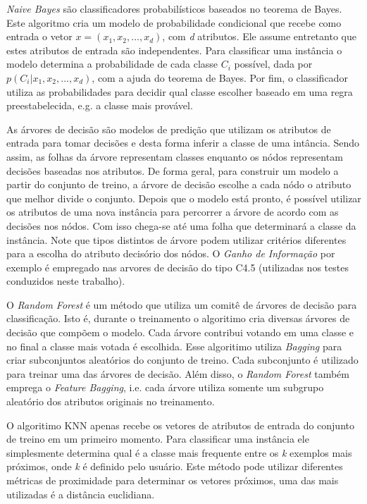 \textit{Naive Bayes} são classificadores probabilísticos baseados no teorema de Bayes.
Este algoritmo cria um modelo de probabilidade condicional que recebe como entrada o vetor $ \textit{x} = (x_1, x_2, ... , x_d) $, com \textit{d} atributos.
Ele assume entretanto que estes atributos de entrada são independentes.
Para classificar uma instância o modelo determina a probabilidade de cada classe $C_i$ possível, dada por $p(C_i|x_1, x_2, ... , x_d)$, com a ajuda do teorema de Bayes.
Por fim, o classificador utiliza as probabilidades para decidir qual classe escolher baseado em uma regra preestabelecida, e.g. a classe mais provável.

As árvores de decisão são modelos de predição que utilizam os atributos de entrada para tomar decisões e desta forma inferir a classe de uma intância.
Sendo assim, as folhas da árvore representam classes enquanto os nódos representam decisões baseadas nos atributos.
De forma geral, para construir um modelo a partir do conjunto de treino, a árvore de decisão escolhe a cada nódo o atributo que melhor divide o conjunto.
Depois que o modelo está pronto, é possível utilizar os atributos de uma nova instância para percorrer a árvore de acordo com as decisões nos nódos.
Com isso chega-se até uma folha que determinará a classe da instância.
Note que tipos distintos de árvore podem utilizar critérios diferentes para a escolha do atributo decisório dos nódos.
O \textit{ Ganho de Informação} por exemplo é empregado nas arvores de decisão do tipo C4.5 (utilizadas nos testes conduzidos neste trabalho).

O \textit{Random Forest} é um método que utiliza um comitê de árvores de decisão para classificação.
Isto é, durante o treinamento o algoritimo cria diversas árvores de decisão que compõem o modelo.
Cada árvore contribui votando em uma classe e no final a classe mais votada é escolhida.
Esse algoritimo utiliza \textit{Bagging} para criar subconjuntos aleatórios do conjunto de treino.
Cada subconjunto é utilizado para treinar uma das árvores de decisão.
Além disso, o \textit{Random Forest} também emprega o \textit{Feature Bagging}, i.e. cada árvore utiliza somente um subgrupo aleatório dos atributos originais no treinamento.

O algoritimo KNN apenas recebe os vetores de atributos de entrada do conjunto de treino em um primeiro momento.
Para classificar uma instância ele simplesmente determina qual é a classe mais frequente entre os \textit{k} exemplos mais próximos, onde \textit{k} é definido pelo usuário.
Este método pode utilizar diferentes métricas de proximidade para determinar os vetores próximos, uma das mais utilizadas é a distância euclidiana.

